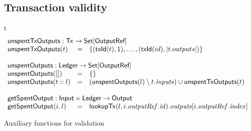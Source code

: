\subsection{Transaction validity}

\begin{ruledfigure}{t}
  \begin{displaymath}
    \begin{array}{lll}
      \multicolumn{3}{l}{\txunspent : \eutxotx \rightarrow \Set{\s{OutputRef}}} \\
      \txunspent(t) &=& \{(\txId(t),1), \ldots, (\txId(id),\left|t.outputs\right|)\}\\
      \\
      \multicolumn{3}{l}{\unspent : \s{Ledger} \rightarrow \Set{\s{OutputRef}}} \\
      \unspent([]) &=& \emptymap \\
      \unspent(t::l) &=& (\unspent(l) \setminus t.\inputs) \cup \txunspent(t)\\
      \\
      \multicolumn{3}{l}{\getSpent : \s{Input} \times \s{Ledger} \rightarrow \s{Output}}\\
      \getSpent(i,l) &=& \lookupTx(l, i.\outputref.\id).\outputs[i.\outputref.\idx]
    \end{array}
  \end{displaymath}
  \caption{Auxiliary functions for \EUTXOma{} validation}
  \label{fig:validation-functions}
\end{ruledfigure}
%
